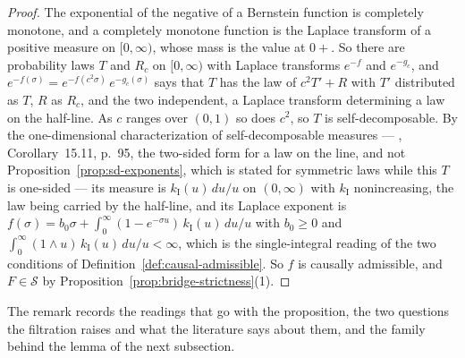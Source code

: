 \begin{proof}
The exponential of the negative of a Bernstein function is completely monotone, and a completely
monotone function is the Laplace transform of a positive measure on $[0,\infty)$, whose mass is
the value at $0{+}$. So there are probability laws $T$ and $R_c$ on $[0,\infty)$ with Laplace
transforms $e^{-f}$ and $e^{-g_c}$, and $e^{-f(\sigma)} = e^{-f(c^2\sigma)}\,e^{-g_c(\sigma)}$
says that $T$ has the law of $c^2T' + R$ with $T'$ distributed as $T$, $R$ as $R_c$, and the two
independent, a Laplace transform determining a law on the half-line. As $c$ ranges over $(0,1)$
so does $c^2$, so $T$ is self-decomposable. By the one-dimensional characterization of
self-decomposable \Levy{} measures --- , Corollary~15.11, p.~95, the
two-sided form for a law on the line, and not Proposition~\ref{prop:sd-exponents}, which is stated
for symmetric laws while this $T$ is one-sided --- its \Levy{}
measure is $k_{\mathrm I}(u)\,du/u$ on $(0,\infty)$ with $k_{\mathrm I}$ nonincreasing, the law
being carried by the half-line, and its Laplace exponent is
$f(\sigma) = b_0\sigma + \int_0^\infty(1 - e^{-\sigma u})\,k_{\mathrm I}(u)\,du/u$ with
$b_0 \ge 0$ and $\int_0^\infty(1 \wedge u)\,k_{\mathrm I}(u)\,du/u < \infty$, which is the
single-integral reading of the two conditions of Definition~\ref{def:causal-admissible}. So $f$ is causally
admissible, and $F \in \mathcal{S}$ by Proposition~\ref{prop:bridge-strictness}(1).
\end{proof}

The remark records the readings that go with the proposition, the two questions the
filtration raises and what the literature says about them, and the family behind the lemma of
the next subsection.

